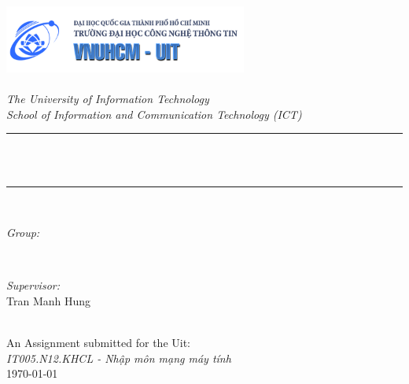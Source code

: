 \begin{titlepage}
\newcommand{\HRule}{\rule{\linewidth}{0.5mm}}
\includegraphics[width=8cm]{title/logo.png}\\[1cm] 
\center 
\quad\\[1.5cm]
\textsl{\Large The University of Information Technology}\\[0.5cm] 
\textsl{\large School of Information and Communication Technology (ICT)}\\[0.5cm] 
\makeatletter
\HRule \\[0.4cm]
{ \huge \bfseries \@title}\\[0.4cm] 
\HRule \\[1.5cm]
\begin{minipage}{0.4\textwidth}
\begin{flushleft} \large
\emph{Group:}\\
\@author 
\end{flushleft}
\end{minipage}
~
\begin{minipage}{0.4\textwidth}
\begin{flushright} \large
\emph{Supervisor:} \\
\textup{Tran Manh Hung}
\end{flushright}
\end{minipage}\\[3cm]
\makeatother
{\large An Assignment submitted for the Uit:}\\[0.5cm]
{\large \emph{IT005.N12.KHCL - Nhập môn mạng máy tính}}\\[0.5cm]
{\large \today}\\[2cm] 
\vfill 
\end{titlepage}